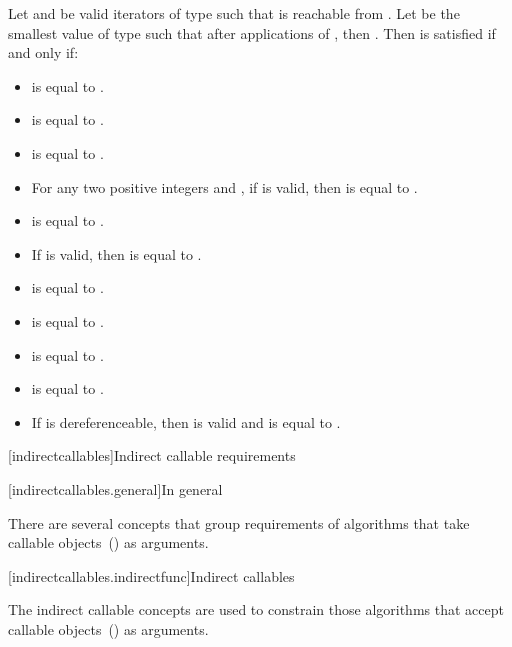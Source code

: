 
\begin{addedblock}
\pnum
Let  and  be valid iterators of type  such that  is reachable
from . Let  be the smallest value of type
 such that after
 applications of , then . Then
 is satisfied if and only if:

\begin{itemize}
\item {} is equal to .
\item {} is equal to .
\item {} is equal to .
\item For any two positive integers  and , if  is valid, then
 is equal to .
\item {} is equal to .
\item If  is valid, then  is equal to .
\item {} is equal to .
\item {} is equal to .
\item {} is equal to .
\item {} is equal to .
\item If  is dereferenceable, then  is valid and is equal to .
\end{itemize}

[indirectcallables]{Indirect callable requirements}

[indirectcallables.general]{In general}

\pnum
There are several concepts that group requirements of algorithms that take callable
objects~() as arguments.


[indirectcallables.indirectfunc]{Indirect callables}

\pnum
The indirect callable concepts are used to constrain those algorithms that accept
callable objects~() as arguments.


\end{addedblock}
